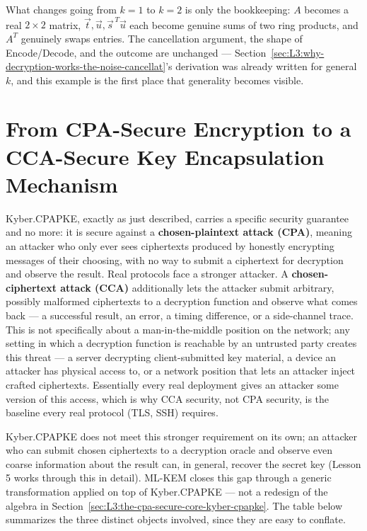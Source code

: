 What changes going from $k=1$ to $k=2$ is only the bookkeeping: $A$ becomes a real $2\times2$ matrix, $\vec t,\vec u,\vec s^{\,T}\vec u$ each become genuine sums of two ring products, and $A^T$ genuinely swaps entries. The cancellation argument, the shape of Encode/Decode, and the outcome are unchanged --- Section~\ref{sec:L3:why-decryption-works-the-noise-cancellat}'s derivation was already written for general $k$, and this example is the first place that generality becomes visible.

\section{From CPA-Secure Encryption to a CCA-Secure Key Encapsulation Mechanism}
\label{sec:L3:from-cpa-secure-encryption-to-a-cca-secu}

Kyber.CPAPKE, exactly as just described, carries a specific security guarantee and no more: it is secure against a \textbf{chosen-plaintext attack (CPA)}, meaning an attacker who only ever sees ciphertexts produced by honestly encrypting messages of their choosing, with no way to submit a ciphertext for decryption and observe the result. Real protocols face a stronger attacker. A \textbf{chosen-ciphertext attack (CCA)} additionally lets the attacker submit arbitrary, possibly malformed ciphertexts to a decryption function and observe what comes back --- a successful result, an error, a timing difference, or a side-channel trace. This is not specifically about a man-in-the-middle position on the network; any setting in which a decryption function is reachable by an untrusted party creates this threat --- a server decrypting client-submitted key material, a device an attacker has physical access to, or a network position that lets an attacker inject crafted ciphertexts. Essentially every real deployment gives an attacker some version of this access, which is why CCA security, not CPA security, is the baseline every real protocol (TLS, SSH) requires.

Kyber.CPAPKE does not meet this stronger requirement on its own; an attacker who can submit chosen ciphertexts to a decryption oracle and observe even coarse information about the result can, in general, recover the secret key (Lesson 5 works through this in detail). ML-KEM closes this gap through a generic transformation applied on top of Kyber.CPAPKE --- not a redesign of the algebra in Section~\ref{sec:L3:the-cpa-secure-core-kyber-cpapke}. The table below summarizes the three distinct objects involved, since they are easy to conflate.

